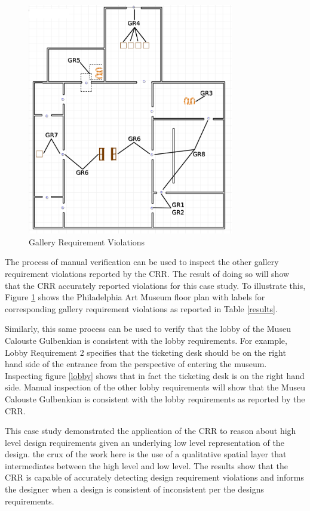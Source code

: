 \documentclass[12pt]{ucthesis}
\begin{document}
\begin{figure}[h]
\centering
\includegraphics[width=90mm]{museum-floor-plan-reqs-crop2}
\caption{Gallery Requirement Violations}
\label{art museum in archiCAD}
\end{figure}

The process of manual verification can be used to inspect the other gallery requirement violations reported by the CRR. The result of doing so will show that the CRR accurately reported violations for this case study. To illustrate this, Figure \ref{art museum in archiCAD} shows the Philadelphia Art Museum floor plan with labels for corresponding gallery requirement violations as reported in Table \ref{results}. 

Similarly, this same process can be used to verify that the lobby of the Museu Calouste Gulbenkian is consistent with the lobby requirements. For example, Lobby Requirement 2 specifies that the ticketing desk should be on the right hand side of the entrance from the perspective of entering the museum. Inspecting figure \ref{lobby} shows that in fact the ticketing desk is on the right hand side. Manual inspection of the other lobby requirements will show that the Museu Calouste Gulbenkian is consistent with the lobby requirements as reported by the CRR.

This case study demonstrated the application of the CRR to reason about high level design requirements given an underlying low level representation of the design. the crux of the work here is the use of a qualitative spatial layer that intermediates between the high level and low level. The results show that the CRR is capable of accurately detecting design requirement violations and informs the designer when a design is consistent of inconsistent per the designs requirements.
\end{document}
